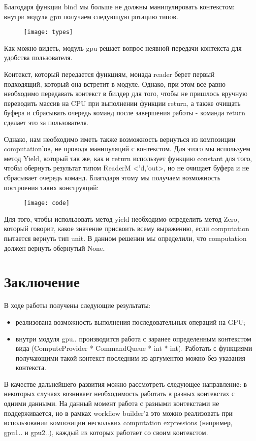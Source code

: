 \documentclass[14pt]{matmex-diploma}
\begin{document}
Благодаря функции bind мы больше не должны манипулировать контекстом: внутри модуля gpu получаем следующую ротацию типов.
\begin{figure}[h] 
\label{table}
\centering 
\texttt{[image: types]} 
\end{figure}

Как можно видеть, модуль gpu решает вопрос неявной передачи контекста для удобства пользователя.

Контекст, который передается функциям, монада reader берет первый подходящий, который она встретит в модуле. 
Однако, при этом все равно необходимо передавать контекст в билдер для того, чтобы не пришлось вручную переводить массив на CPU при выполнении функции return, а также очищать буфера и сбрасывать очередь команд после завершения работы - команда return сделает это за пользователя.

Однако, нам необходимо иметь также возможность вернуться из композиции computation’ов, не проводя манипуляций с контекстом. Для этого мы используем метод Yield, который так же, как и return использует функцию constant для того, чтобы обернуть результат типом ReaderM <’d,’out>, но не очищает буфера и не сбрасывает очередь команд.
Благодаря этому мы получаем возможность построения таких конструкций:
\begin{figure}[h] 
\label{code}
\texttt{[image: code]} 
\end{figure}

Для того, чтобы использовать метод yield необходимо определить метод Zero, который говорит, какое значение присвоить всему выражению, если computation пытается вернуть тип unit. В данном решении мы определили, что computation должен вернуть обернутый None.

\section*{Заключение}
В ходе работы получены следующие результаты:
\begin{itemize}
    \item реализована возможность выполнения последовательных операций на GPU;
    \item внутри модуля gpu{..} производится работа с заранее определенным       контекстом вида (ComputeProvider * CommandQueue * int * int). Работать с функциями получающими такой контекст последним из аргументов можно без указания контекста.
\end{itemize}

В качестве дальнейшего развития можно рассмотреть следующее направление: в некоторых случаях возникает необходимость работать в разных контекстах с одними данными. На данный момент работа с разными контекстами не поддерживается, но в рамках workflow builder’а это можно реализовать при использовании композиции нескольких computation expressions (например, gpu1{..} и gpu2{..}), каждый из которых работает со своим контекстом. 

\setmonofont[Mapping=tex-text]{CMU Typewriter Text}


\end{document}
